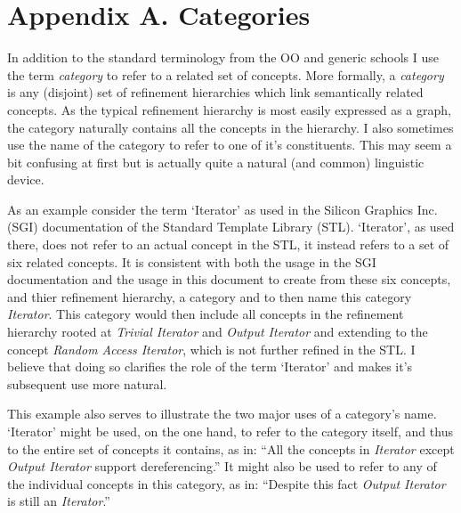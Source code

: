 \documentclass{article}
\begin{document}
\section{Appendix A. Categories}
In addition to the standard terminology from the OO and generic schools I use the term
\emph{category} to refer to a related set of concepts. More formally, a \emph{category}
is any (disjoint) set of refinement hierarchies which link
semantically related concepts. As the typical refinement hierarchy is most easily expressed
as a graph, the category naturally contains all the concepts in the hierarchy.
I also sometimes use the name of the category to refer to one of it's constituents. This may seem a bit
confusing at first but is actually quite a natural (and common) linguistic device.


As an example consider the term `Iterator' as used in the Silicon Graphics Inc.
(SGI) documentation of the Standard Template Library (STL). `Iterator', as used there, does
not refer to an actual concept in the STL, it instead refers to a set of six related concepts.
It is consistent with both the usage in the SGI documentation and the usage in this document to create
from these six concepts, and thier refinement hierarchy, a category and to then name this category
\emph{Iterator}. This category would then include all concepts in 
the refinement hierarchy rooted at \emph{Trivial Iterator} and \emph{Output Iterator} and extending to
the concept \emph{Random Access Iterator}, which is not further refined in the STL. I believe that doing
so clarifies the role of the term `Iterator' and makes it's subsequent use more natural.

This example also serves to
illustrate the two major uses of a category's name. `Iterator' might be used, on the one hand,
to refer to the category itself, and thus to the entire set of concepts it contains, as in:
``All the concepts in \emph{Iterator} except \emph{Output Iterator} support dereferencing.''
It might also be used to refer to any of the individual concepts in this category, as in:
``Despite this fact \emph{Output Iterator} is still an \emph{Iterator}.''
\end{document}
